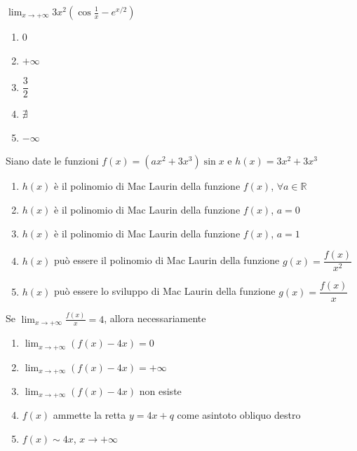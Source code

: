 \begin{quiz}
$\displaystyle\lim_{x\to+\infty}3x^2\left(\cos\frac1x-e^{x/2}\right)$
\begin{enumerate}
\item $0$
\item $+\infty$
\item $\dfrac32$
\item $\nexists$
\item $-\infty$
\end{enumerate}
\end{quiz}

\begin{quiz}
Siano date le funzioni $f(x)=(ax^2+3x^3)\sin x$ e $h(x)=3x^2+3x^3$
\begin{enumerate}
\item $h(x)$ \`e il polinomio di Mac Laurin della funzione $f(x)$, $\forall a\in\mathbb R$
\item $h(x)$ \`e il polinomio di Mac Laurin della funzione $f(x)$, $a=0$
\item $h(x)$ \`e il polinomio di Mac Laurin della funzione $f(x)$, $a=1$
\item $h(x)$ pu\`o essere il polinomio di Mac Laurin della funzione $g(x)=\dfrac{f(x)}{x^2}$
\item $h(x)$ pu\`o essere lo sviluppo di Mac Laurin della funzione $g(x)=\dfrac{f(x)}x$
\end{enumerate}
\end{quiz}

\begin{quiz}
Se $\displaystyle\lim_{x\to+\infty}\frac{f(x)}x=4$, allora necessariamente
\begin{enumerate}
\item $\displaystyle\lim_{x\to+\infty}(f(x)-4x)=0$
\item $\displaystyle\lim_{x\to+\infty}(f(x)-4x)=+\infty$
\item $\displaystyle\lim_{x\to+\infty}(f(x)-4x)$ non esiste
\item $f(x)$ ammette la retta $y=4x+q$ come asintoto obliquo destro
\item $f(x)\sim4x$, $x\to+\infty$
\end{enumerate}
\end{quiz}

